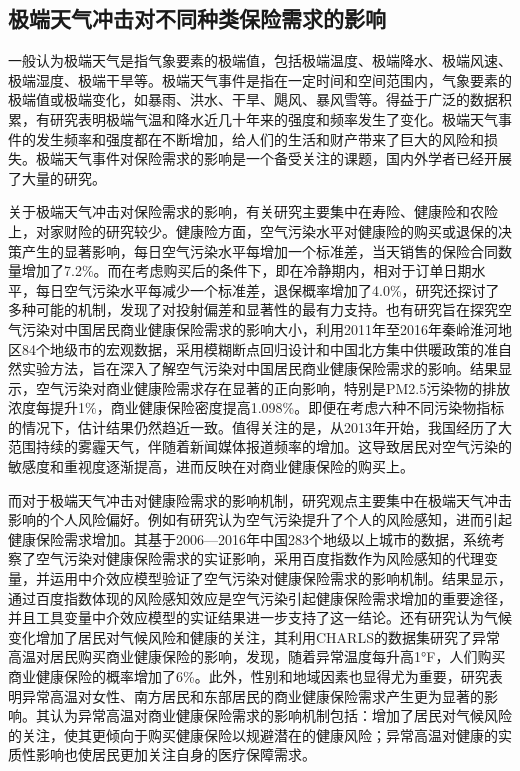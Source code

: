 \subsection{极端天气冲击对不同种类保险需求的影响}
一般认为极端天气是指气象要素的极端值，包括极端温度、极端降水、极端风速、极端湿度、极端干旱等\citep{傅良2022ECMWF,吴大明2021近年来全球极端天气气候事件情况及影响分析}。极端天气事件是指在一定时间和空间范围内，气象要素的极端值或极端变化，如暴雨、洪水、干旱、飓风、暴风雪等。得益于广泛的数据积累，有研究表明极端气温和降水近几十年来的强度和频率发生了变化\citep{ummenhofer2017extreme}。极端天气事件的发生频率和强度都在不断增加，给人们的生活和财产带来了巨大的风险和损失。极端天气事件对保险需求的影响是一个备受关注的课题，国内外学者已经开展了大量的研究。

关于极端天气冲击对保险需求的影响，有关研究主要集中在寿险、健康险和农险上，对家财险的研究较少。健康险方面，空气污染水平对健康险的购买或退保的决策产生的显著影响\citep{2018Something}，每日空气污染水平每增加一个标准差，当天销售的保险合同数量增加了7.2\%。而在考虑购买后的条件下，即在冷静期内，相对于订单日期水平，每日空气污染水平每减少一个标准差，退保概率增加了4.0\%，研究还探讨了多种可能的机制，发现了对投射偏差和显著性的最有力支持。也有研究旨在探究空气污染对中国居民商业健康保险需求的影响大小\citep{赵强2021空气污染对商业健康保险需求的影响}，利用2011年至2016年秦岭淮河地区84个地级市的宏观数据，采用模糊断点回归设计和中国北方集中供暖政策的准自然实验方法，旨在深入了解空气污染对中国居民商业健康保险需求的影响。结果显示，空气污染对商业健康险需求存在显著的正向影响，特别是PM2.5污染物的排放浓度每提升1\%，商业健康保险密度提高1.098\%。即便在考虑六种不同污染物指标的情况下，估计结果仍然趋近一致。值得关注的是，从2013年开始，我国经历了大范围持续的雾霾天气，伴随着新闻媒体报道频率的增加。这导致居民对空气污染的敏感度和重视度逐渐提高，进而反映在对商业健康保险的购买上。

而对于极端天气冲击对健康险需求的影响机制，研究观点主要集中在极端天气冲击影响的个人风险偏好。例如有研究认为空气污染提升了个人的风险感知，进而引起健康保险需求增加\citep{宋平凡2022空气污染}。其基于2006—2016年中国283个地级以上城市的数据，系统考察了空气污染对健康保险需求的实证影响，采用百度指数作为风险感知的代理变量，并运用中介效应模型验证了空气污染对健康保险需求的影响机制。结果显示，通过百度指数体现的风险感知效应是空气污染引起健康保险需求增加的重要途径，并且工具变量中介效应模型的实证结果进一步支持了这一结论。还有研究认为气候变化增加了居民对气候风险和健康的关注\cite{zhong2022exposure}，其利用CHARLS的数据集研究了异常高温对居民购买商业健康保险的影响，发现，随着异常温度每升高1°F，人们购买商业健康保险的概率增加了6\%。此外，性别和地域因素也显得尤为重要，研究表明异常高温对女性、南方居民和东部居民的商业健康保险需求产生更为显著的影响。其认为异常高温对商业健康保险需求的影响机制包括：增加了居民对气候风险的关注，使其更倾向于购买健康保险以规避潜在的健康风险；异常高温对健康的实质性影响也使居民更加关注自身的医疗保障需求。

